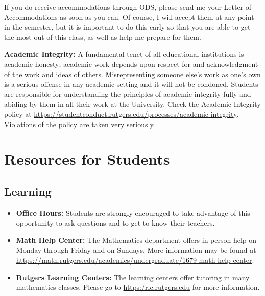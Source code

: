 \documentclass{article}
\begin{document}
\par \hfill \par \noindent
If you do receive accommodations through ODS, please send me your Letter of Accommodations as soon as you can. Of course, I will accept them at any point in the semester, but it is important to do this early so that you are able to get the most out of this class, as well as help me prepare for them.
\par \hfill \par \noindent
\textbf{Academic Integrity:} A fundamental tenet of all educational institutions is academic honesty; academic work depends upon respect for and acknowledgment of the work and ideas of others. Misrepresenting someone else's work as one's own is a serious offense in any academic setting and it will not be condoned.
Students are responsible for understanding the principles of academic integrity fully and abiding by them in all their work at the University. Check the Academic Integrity policy at \href{https://studentconduct.rutgers.edu/processes/academic-integrity}{https://studentconduct.rutgers.edu/processes/academic-integrity}. Violations of the policy are taken very seriously.


\section*{Resources for Students}

\subsection*{Learning}
\begin{itemize}
    \item \textbf{Office Hours:} Students are strongly encouraged to take advantage of this opportunity to ask questions and to get to know their teachers.
    \item \textbf{Math Help Center:} The Mathematics department offers in-person help on Monday through Friday and on Sundays. More information may be found at \href{https://math.rutgers.edu/academics/undergraduate/1679-math-help-center}{https://math.rutgers.edu/academics/undergraduate/1679-math-help-center}.
    \item \textbf{Rutgers Learning Centers:} The learning centers offer tutoring in many mathematics classes. Please go to \href{https:/rlc.rutgers.edu}{https:/rlc.rutgers.edu} for more information.
\end{itemize}
\end{document}
